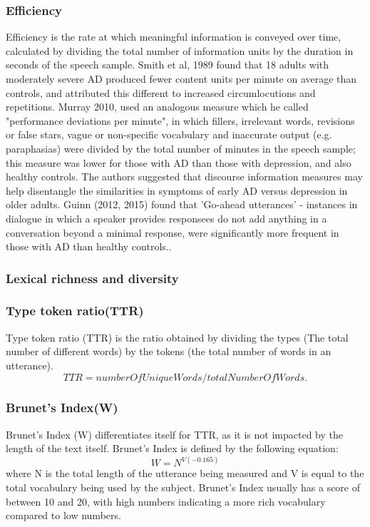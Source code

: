 \documentclass{article}
\begin{document}
\subsubsection{Efficiency}
Efficiency is the rate at which meaningful information is conveyed over time, calculated by dividing the total number of information units by the duration in seconds of the speech sample. Smith et al, 1989 found that 18 adults with moderately severe AD produced fewer content units per minute on average than controls, and attributed this different to increased circumlocutions and repetitions. Murray 2010, used an analogous measure which he called "performance deviations per minute", in which fillers, irrelevant words, revisions or false stars, vague or non-specific vocabulary and inaccurate output (e.g. paraphasias) were divided by the total number of minutes in the speech sample; this measure was lower for those with AD than those with depression, and also healthy controls. The authors suggested that discourse information measures may help disentangle the similarities in symptoms of early AD versus depression in older adults. Guinn (2012, 2015) \cite{Guinn2012, Guinn2015} found that 'Go-ahead utterances' - instances in dialogue in which a speaker provides responsees do not add anything in a conversation beyond a minimal response, were significantly more frequent in those with AD than healthy controls..\newline
\subsubsection{Lexical richness and diversity}
\subsubsection{Type token ratio(TTR)}
Type token ratio (TTR) is the ratio obtained by dividing the types (The total number of different words) by the tokens (the total number of words in an utterance).
\begin{equation} \label{x1}
TTR = numberOfUniqueWords / totalNumberOfWords.
\end{equation}
\subsubsection{Brunet's Index(W)} %
Brunet's Index (W) differentiates itself for TTR, as it is not impacted by the length of the text itself. Brunet's Index is defined by the following equation:
\begin{equation} \label{x2}
W = N^{V(-0.165)}
\end{equation}
where N is the total length of the utterance being measured and V is equal to the total vocabulary being used by the subject. Brunet's Index usually has a score of between 10 and 20, with high numbers indicating a more rich vocabulary compared to low numbers. \newline
\par
\end{document}
